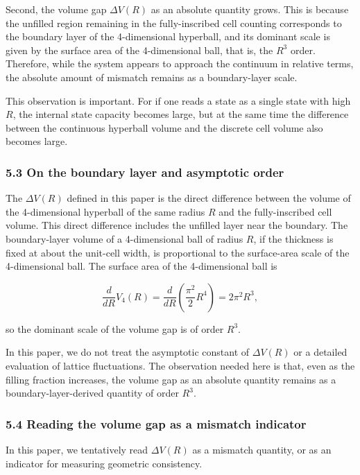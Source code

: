 \documentclass[
]{article}
\begin{document}
Second, the volume gap \(\Delta V(R)\) as an absolute quantity grows.
This is because the unfilled region remaining in the fully-inscribed
cell counting corresponds to the boundary layer of the 4-dimensional
hyperball, and its dominant scale is given by the surface area of the
4-dimensional ball, that is, the \(R^3\) order. Therefore, while the
system appears to approach the continuum in relative terms, the absolute
amount of mismatch remains as a boundary-layer scale.

This observation is important. For if one reads a state as a single
state with high \(R\), the internal state capacity becomes large, but at
the same time the difference between the continuous hyperball volume and
the discrete cell volume also becomes large.

\subsubsection{5.3 On the boundary layer and asymptotic
order}\label{on-the-boundary-layer-and-asymptotic-order}

The \(\Delta V(R)\) defined in this paper is the direct difference
between the volume of the 4-dimensional hyperball of the same radius
\(R\) and the fully-inscribed cell volume. This direct difference
includes the unfilled layer near the boundary. The boundary-layer volume
of a 4-dimensional ball of radius \(R\), if the thickness is fixed at
about the unit-cell width, is proportional to the surface-area scale of
the 4-dimensional ball. The surface area of the 4-dimensional ball is

\[
\frac{d}{dR}V_4(R)=\frac{d}{dR}\left(\frac{\pi^2}{2}R^4\right)=2\pi^2R^3,
\]

so the dominant scale of the volume gap is of order \(R^3\).

In this paper, we do not treat the asymptotic constant of
\(\Delta V(R)\) or a detailed evaluation of lattice fluctuations. The
observation needed here is that, even as the filling fraction increases,
the volume gap as an absolute quantity remains as a
boundary-layer-derived quantity of order \(R^3\).

\subsubsection{5.4 Reading the volume gap as a mismatch
indicator}\label{reading-the-volume-gap-as-a-mismatch-indicator}

In this paper, we tentatively read \(\Delta V(R)\) as a mismatch
quantity, or as an indicator for measuring geometric consistency.
\end{document}

